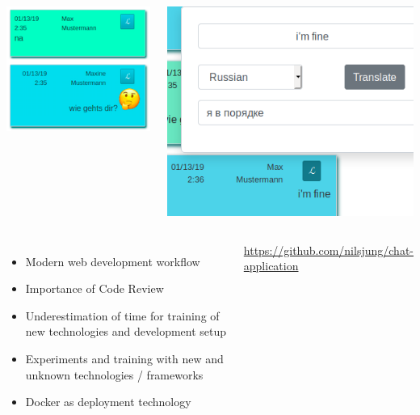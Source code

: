 \documentclass[20pt, a1paper]{tikzposter}
\begin{document}
\begin{columns}
{		\begin{minipage}[t][6cm]{0.5\linewidth}
			\begin{tikzfigure}
				\includegraphics[scale=1.3]{chat-single.png}
			\end{tikzfigure}
		\end{minipage}		
		\begin{minipage}[t][6cm]{0.5\linewidth}
			\begin{tikzfigure}
				\includegraphics[scale=0.9]{chat-translation.png}
			\end{tikzfigure}
		\end{minipage}

		}

	\end{columns}
	
	\begin{columns}	
		{
			\begin{itemize}
				\item Modern web development workflow
				\item Importance of Code Review
				\item Underestimation of time for training of new technologies and development setup
				\item Experiments and training with new and unknown technologies / frameworks
				\item Docker as deployment technology
			\end{itemize}
		}
		{
			\url{https://github.com/nilsjung/chat-application}	
			
		}
	\end{columns}

	

	
\end{document}
